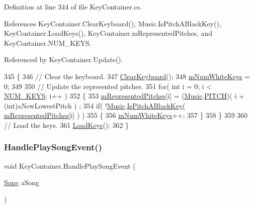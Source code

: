 Definition at line 344 of file Key\+Container.\+cs.



References Key\+Container.\+Clear\+Keyboard(), Music.\+Is\+Pitch\+A\+Black\+Key(), Key\+Container.\+Load\+Keys(), Key\+Container.\+m\+Represented\+Pitches, and Key\+Container.\+N\+U\+M\+\_\+\+K\+E\+YS.



Referenced by Key\+Container.\+Update().


\begin{DoxyCode}
345     \{
346         \textcolor{comment}{// Clear the keyboard.}
347         \hyperlink{group___key_contain_priv_func_ga679f5ca9d6b1505180e90ee00bbfe616}{ClearKeyboard}();
348         \hyperlink{group___key_contain_priv_var_ga7a5547a1fe5c40eac487fe6c826c8f9c}{mNumWhiteKeys} = 0;
349 
350         \textcolor{comment}{// Update the represented pitches.}
351         \textcolor{keywordflow}{for}( \textcolor{keywordtype}{int} i = 0; i < \hyperlink{group___key_contain_const_gaa8fe6473e6396976e52c5793f027380e}{NUM\_KEYS}; i++ )
352         \{
353             \hyperlink{group___key_contain_priv_var_ga103945a6efe3469191e5253d13fec5be}{mRepresentedPitches}[i] = (\hyperlink{class_music}{Music}.\hyperlink{group___music_enums_ga508f69b199ea518f935486c990edac1d}{PITCH})( i + (\textcolor{keywordtype}{int})aNewLowestPitch )
      ;
354             \textcolor{keywordflow}{if}( !\hyperlink{class_music}{Music}.\hyperlink{group___music_stat_func_gacc2c1a66df7197225f61c5737f794065}{IsPitchABlackKey}( 
      \hyperlink{group___key_contain_priv_var_ga103945a6efe3469191e5253d13fec5be}{mRepresentedPitches}[i] ) )
355             \{
356                 \hyperlink{group___key_contain_priv_var_ga7a5547a1fe5c40eac487fe6c826c8f9c}{mNumWhiteKeys}++;
357             \}
358         \}
359 
360         \textcolor{comment}{// Load the keys.}
361         \hyperlink{group___key_contain_priv_func_ga65f79700f265d2223681ac95981ab4a3}{LoadKeys}();
362     \}
\end{DoxyCode}
\mbox{\label{group___key_contain_handlers_ga894c823059c5268af0954f83c04036ed}} 
\subsubsection{\texorpdfstring{Handle\+Play\+Song\+Event()}{HandlePlaySongEvent()}}
{\footnotesize\ttfamily void Key\+Container.\+Handle\+Play\+Song\+Event (\begin{DoxyParamCaption}\item[{\hyperlink{class_song}{Song}}]{a\+Song }\end{DoxyParamCaption})\hspace{0.3cm}{\ttfamily [private]}}



